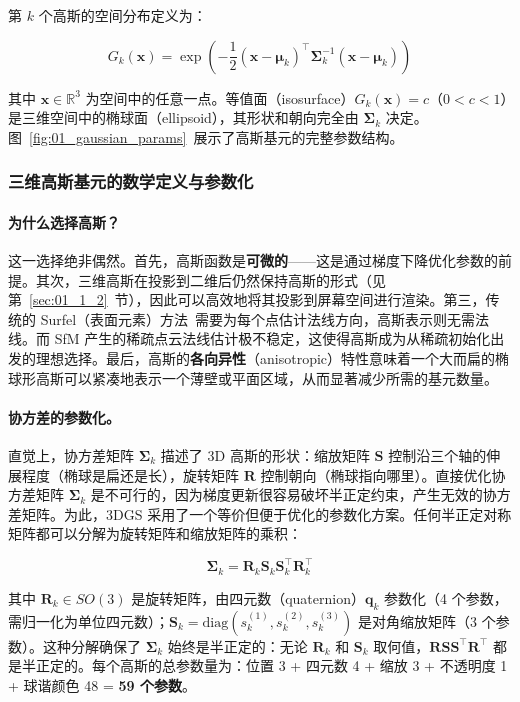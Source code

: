 第 $k$ 个高斯的空间分布定义为：

\begin{equation}
\label{eq:gaussian_3d}
G_k(\mathbf{x}) = \exp\!\left(-\frac{1}{2}(\mathbf{x} - \boldsymbol{\mu}_k)^\top \boldsymbol{\Sigma}_k^{-1} (\mathbf{x} - \boldsymbol{\mu}_k)\right)
\end{equation}

其中 $\mathbf{x} \in \mathbb{R}^3$ 为空间中的任意一点。等值面（isosurface）$G_k(\mathbf{x}) = c$（$0 < c < 1$）是三维空间中的椭球面（ellipsoid），其形状和朝向完全由 $\boldsymbol{\Sigma}_k$ 决定。图~\ref{fig:01_gaussian_params}~展示了高斯基元的完整参数结构。

\subsubsection{三维高斯基元的数学定义与参数化}

\paragraph{为什么选择高斯？} 这一选择绝非偶然。首先，高斯函数是\textbf{可微的}——这是通过梯度下降优化参数的前提。其次，三维高斯在投影到二维后仍然保持高斯的形式（见第~\ref{sec:01_1_2}~节），因此可以高效地将其投影到屏幕空间进行渲染。第三，传统的 Surfel（表面元素）方法~\cite{yifan19,kopanas21}需要为每个点估计法线方向，高斯表示则无需法线。而 SfM 产生的稀疏点云法线估计极不稳定，这使得高斯成为从稀疏初始化出发的理想选择。最后，高斯的\textbf{各向异性}（anisotropic）特性意味着一个大而扁的椭球形高斯可以紧凑地表示一个薄壁或平面区域，从而显著减少所需的基元数量。

\paragraph{协方差的参数化。} 直觉上，协方差矩阵 $\boldsymbol{\Sigma}_k$ 描述了 3D 高斯的形状：缩放矩阵 $\mathbf{S}$ 控制沿三个轴的伸展程度（椭球是扁还是长），旋转矩阵 $\mathbf{R}$ 控制朝向（椭球指向哪里）。直接优化协方差矩阵 $\boldsymbol{\Sigma}_k$ 是不可行的，因为梯度更新很容易破坏半正定约束，产生无效的协方差矩阵。为此，3DGS 采用了一个等价但便于优化的参数化方案。任何半正定对称矩阵都可以分解为旋转矩阵和缩放矩阵的乘积：

\begin{equation}
\label{eq:cov_decomp}
\boldsymbol{\Sigma}_k = \mathbf{R}_k \mathbf{S}_k \mathbf{S}_k^\top \mathbf{R}_k^\top
\end{equation}

其中 $\mathbf{R}_k \in SO(3)$ 是旋转矩阵，由四元数（quaternion）$\mathbf{q}_k$ 参数化（4 个参数，需归一化为单位四元数）；$\mathbf{S}_k = \mathrm{diag}(s_k^{(1)}, s_k^{(2)}, s_k^{(3)})$ 是对角缩放矩阵（3 个参数）。这种分解确保了 $\boldsymbol{\Sigma}_k$ 始终是半正定的：无论 $\mathbf{R}_k$ 和 $\mathbf{S}_k$ 取何值，$\mathbf{R}\mathbf{S}\mathbf{S}^\top\mathbf{R}^\top$ 都是半正定的。每个高斯的总参数量为：位置 3 + 四元数 4 + 缩放 3 + 不透明度 1 + 球谐颜色 48 = \textbf{59 个参数}。

